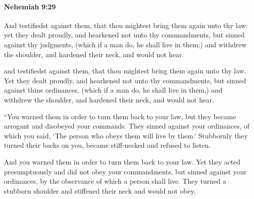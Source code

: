 		\paragraph{Nehemiah 9:29} %
			\label{NEHEMIAH-9-29}

			And testifiedst against them, that thou mightest bring them again unto thy law: yet they dealt proudly, and hearkened not unto thy commandments, but sinned against thy judgments, (which if a man do, he shall live in them;) and withdrew the shoulder, and hardened their neck, and would not hear.

			\begin{versebox}
					\item[BHS] 
					\item[LXX] 
					\item[ASV] and testifiedst against them, that thou mightest bring them again unto thy law. Yet they dealt proudly, and hearkened not unto thy commandments, but sinned against thine ordinances, (which if a man do, he shall live in them,) and withdrew the shoulder, and hardened their neck, and would not hear.
					\item[NIV] “You warned them in order to turn them back to your law, but they became arrogant and disobeyed your commands. They sinned against your ordinances, of which you said, ‘The person who obeys them will live by them.’ Stubbornly they turned their backs on you, became stiff-necked and refused to listen.
					\item[NRSV] And you warned them in order to turn them back to your law. Yet they acted presumptuously and did not obey your commandments, but sinned against your ordinances, by the observance of which a person shall live. They turned a stubborn shoulder and stiffened their neck and would not obey.
			\end{versebox}

